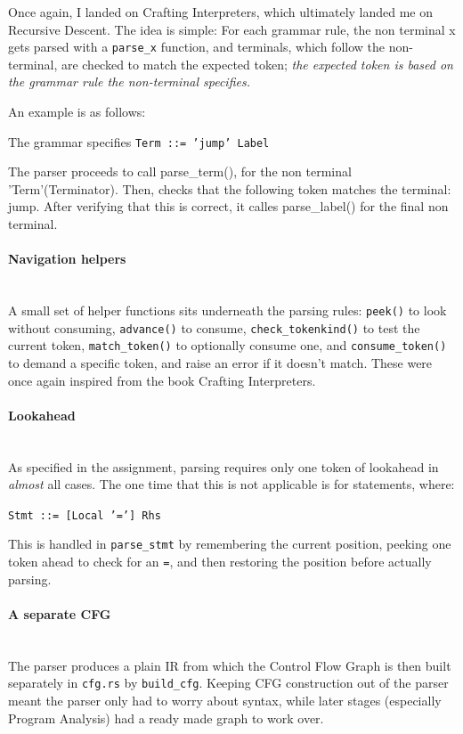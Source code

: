 \documentclass[11pt,a4paper,oneside]{report}
\begin{document}
	Once again, I landed on Crafting Interpreters, which ultimately landed me on Recursive Descent. The idea is simple: For each grammar rule, the non terminal x gets parsed with a \texttt{parse\_x} function, and terminals, which follow the non-terminal, are checked to match the expected token; \textit{the expected token is based on the grammar rule the non-terminal specifies.}
	
	An example is as follows: 
	\begin{center}
		The grammar specifies \texttt{Term ::= 'jump' Label}
	\end{center}
	
		The parser proceeds to call parse\_term(), for the non terminal 'Term'(Terminator). Then, checks that the following token matches the terminal: jump. After verifying that this is correct, it calles parse\_label() for the final non terminal. 
	
	
	\paragraph{Navigation helpers}\mbox{}\\
	A small set of helper functions sits underneath the parsing rules: \texttt{peek()} to look without consuming, \texttt{advance()} to consume, \texttt{check\_tokenkind()} to test the current token, \texttt{match\_token()} to optionally consume one, and \texttt{consume\_token()} to demand a specific token, and raise an error if it doesn't match. These were once again inspired from the book Crafting Interpreters. 
	
	\paragraph{Lookahead}\mbox{}\\
	As specified in the assignment, parsing requires only one token of lookahead in \textit{almost} all cases. The one time that this is not applicable is for statements, where:
	
	\begin{center}
	\texttt{Stmt ::= [Local '='] Rhs}
	\end{center}
	
	This is handled in \texttt{parse\_stmt} by remembering the current position, peeking one token ahead to check for an \texttt{=}, and then restoring the position before actually parsing.
	\paragraph{A separate CFG}\mbox{}\\
	The parser produces a plain IR from which the Control Flow Graph is then built separately in \texttt{cfg.rs} by \texttt{build\_cfg}. Keeping CFG construction out of the parser meant the parser only had to worry about syntax, while later stages (especially Program Analysis) had a ready made graph to work over.
\end{document}
